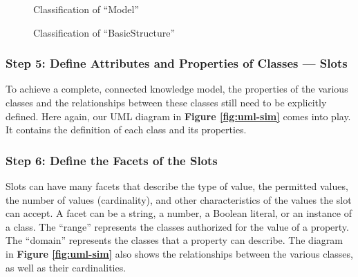     \begin{figure}[h]
        \centering
        \caption{\label{fig:classi-model} Classification of “Model”}
    \end{figure}
    
    \begin{figure}[h]
        \centering
        \caption{\label{fig:classi-basic-struct} Classification of “BasicStructure”}
    \end{figure}
    

    
    \subsubsection{Step 5: Define Attributes and Properties of Classes — Slots}
    To achieve a complete, connected knowledge model, the properties of the various classes and the relationships between these classes still need to be explicitly defined. Here again, our UML diagram in \textbf{Figure \ref{fig:uml-sim}} comes into play. It contains the definition of each class and its properties.
    
    
    \subsubsection{Step 6: Define the Facets of the Slots}
    Slots can have many facets that describe the type of value, the permitted values, the number of values (cardinality), and other characteristics of the values the slot can accept. A facet can be a string, a number, a Boolean literal, or an instance of a class. The “range” represents the classes authorized for the value of a property. The “domain” represents the classes that a property can describe. The diagram in \textbf{Figure \ref{fig:uml-sim}} also shows the relationships between the various classes, as well as their cardinalities.
    
